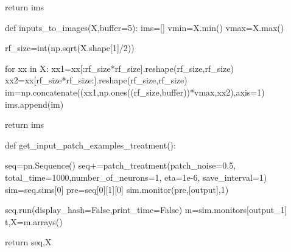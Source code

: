 \documentclass[
  letterpaper,
  DIV=11,
  numbers=noendperiod]{scrreprt}
\newenvironment{Shaded}{\begin{snugshade}}{\end{snugshade}}
\newcommand{\BuiltInTok}[1]{\textcolor[rgb]{0.00,0.23,0.31}{#1}}
\newcommand{\ControlFlowTok}[1]{\textcolor[rgb]{0.00,0.23,0.31}{#1}}
\newcommand{\DecValTok}[1]{\textcolor[rgb]{0.68,0.00,0.00}{#1}}
\newcommand{\FloatTok}[1]{\textcolor[rgb]{0.68,0.00,0.00}{#1}}
\newcommand{\KeywordTok}[1]{\textcolor[rgb]{0.00,0.23,0.31}{#1}}
\newcommand{\NormalTok}[1]{\textcolor[rgb]{0.00,0.23,0.31}{#1}}
\newcommand{\OperatorTok}[1]{\textcolor[rgb]{0.37,0.37,0.37}{#1}}
\newcommand{\StringTok}[1]{\textcolor[rgb]{0.13,0.47,0.30}{#1}}
\newcommand{\VariableTok}[1]{\textcolor[rgb]{0.07,0.07,0.07}{#1}}
\begin{document}
\begin{Shaded}
\begin{Highlighting}[]
    \ControlFlowTok{return}\NormalTok{ ims}

\KeywordTok{def}\NormalTok{ inputs\_to\_images(X,}\BuiltInTok{buffer}\OperatorTok{=}\DecValTok{5}\NormalTok{):}
\NormalTok{    ims}\OperatorTok{=}\NormalTok{[]}
\NormalTok{    vmin}\OperatorTok{=}\NormalTok{X.}\BuiltInTok{min}\NormalTok{()}
\NormalTok{    vmax}\OperatorTok{=}\NormalTok{X.}\BuiltInTok{max}\NormalTok{()}
    
\NormalTok{    rf\_size}\OperatorTok{=}\BuiltInTok{int}\NormalTok{(np.sqrt(X.shape[}\DecValTok{1}\NormalTok{]}\OperatorTok{/}\DecValTok{2}\NormalTok{))}
        
    \ControlFlowTok{for}\NormalTok{ xx }\KeywordTok{in}\NormalTok{ X:}
\NormalTok{        xx1}\OperatorTok{=}\NormalTok{xx[:rf\_size}\OperatorTok{*}\NormalTok{rf\_size].reshape(rf\_size,rf\_size)}
\NormalTok{        xx2}\OperatorTok{=}\NormalTok{xx[rf\_size}\OperatorTok{*}\NormalTok{rf\_size:].reshape(rf\_size,rf\_size)}
\NormalTok{        im}\OperatorTok{=}\NormalTok{np.concatenate((xx1,np.ones((rf\_size,}\BuiltInTok{buffer}\NormalTok{))}\OperatorTok{*}\NormalTok{vmax,xx2),axis}\OperatorTok{=}\DecValTok{1}\NormalTok{)   }
\NormalTok{        ims.append(im)}
        
    \ControlFlowTok{return}\NormalTok{ ims}

\KeywordTok{def}\NormalTok{ get\_input\_patch\_examples\_treatment():}
    
\NormalTok{    seq}\OperatorTok{=}\NormalTok{pn.Sequence()    }
\NormalTok{    seq}\OperatorTok{+=}\NormalTok{patch\_treatment(patch\_noise}\OperatorTok{=}\FloatTok{0.5}\NormalTok{,}
\NormalTok{               total\_time}\OperatorTok{=}\DecValTok{1000}\NormalTok{,number\_of\_neurons}\OperatorTok{=}\DecValTok{1}\NormalTok{,}
\NormalTok{               eta}\OperatorTok{=}\FloatTok{1e{-}6}\NormalTok{,}
\NormalTok{               save\_interval}\OperatorTok{=}\DecValTok{1}\NormalTok{)}
\NormalTok{    sim}\OperatorTok{=}\NormalTok{seq.sims[}\DecValTok{0}\NormalTok{]}
\NormalTok{    pre}\OperatorTok{=}\NormalTok{seq[}\DecValTok{0}\NormalTok{][}\DecValTok{1}\NormalTok{][}\DecValTok{0}\NormalTok{]}
\NormalTok{    sim.monitor(pre,[}\StringTok{\textquotesingle{}output\textquotesingle{}}\NormalTok{],}\DecValTok{1}\NormalTok{)}

\NormalTok{    seq.run(display\_hash}\OperatorTok{=}\VariableTok{False}\NormalTok{,print\_time}\OperatorTok{=}\VariableTok{False}\NormalTok{)}
\NormalTok{    m}\OperatorTok{=}\NormalTok{sim.monitors[}\StringTok{\textquotesingle{}output\_1\textquotesingle{}}\NormalTok{]}
\NormalTok{    t,X}\OperatorTok{=}\NormalTok{m.arrays()    }
    
    \ControlFlowTok{return}\NormalTok{ seq,X}
\end{Highlighting}
\end{Shaded}
\end{document}
